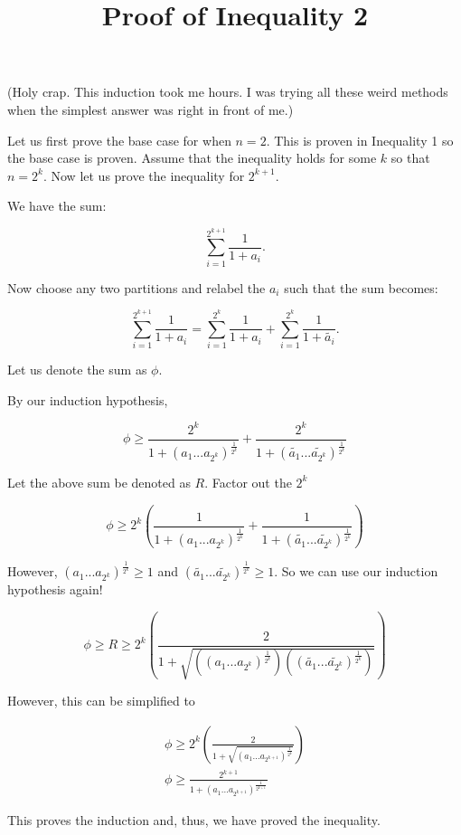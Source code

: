 \documentclass[11pt]{article}
\title{Proof of Inequality 2}
\author{\Name}
\begin{document}
 \maketitle
 
 (Holy crap. This induction took me hours. I was trying all these weird methods when the simplest answer was right in front of me.)
 \newline \newline
 \noindent
 
 Let us first prove the base case for when $n = 2$. This is proven in Inequality 1 so the base case is proven. Assume
 that the inequality holds for some $k$ so that $n = 2^k$. Now let us prove the inequality for 
 $2^{k+1}$. \newline
 
 \noindent
 
 We have the sum:
 
 \begin{equation}
  \sum_{i=1}^{2^{k+1}} \frac{1}{1+a_i}.
 \end{equation}
 
 Now choose any two partitions and relabel the $a_i$ such that the sum becomes:
 
  \begin{equation}
  \sum_{i=1}^{2^{k+1}} \frac{1}{1+a_i} = \sum_{i=1}^{2^{k}} \frac{1}{1+a_i} + \sum_{i=1}^{2^{k}} \frac{1}{1+\widetilde{a_i}}.
 \end{equation}
 
 Let us denote the sum as $\phi$. \newline
 
 
 By our induction hypothesis,
 
 \begin{equation}
  \phi \geq \frac{2^k}{1 + (a_1...a_{2^k})^{\frac{1}{2^k}}} + \frac{2^k}{1 + (\widetilde{a_1}...\widetilde{a_{2^k}})^{\frac{1}{2^k}}}
 \end{equation}

Let the above sum be denoted as $R$. Factor out the $2^k$

\begin{equation}
 \phi \geq 2^k(\frac{1}{1 + (a_1...a_{2^k})^{\frac{1}{2^k}}} + \frac{1}{1 + (\widetilde{a_1}...\widetilde{a_{2^k}})^{\frac{1}{2^k}}})
\end{equation}

However, $(a_1...a_{2^k})^{\frac{1}{2^k}} \geq 1$ and $(\widetilde{a_1}...\widetilde{a_{2^k}})^{\frac{1}{2^k}} \geq 1$. So we can
use our induction hypothesis again!

\begin{equation}
 \phi \geq R \geq 2^k(\frac{2}{1 + \sqrt{((a_1...a_{2^{k}})^{\frac{1}{2^k}})((\widetilde{a_1}...\widetilde{a_{2^k}})^{\frac{1}{2^k}})}})
\end{equation}

However, this can be simplified to

\begin{gather}
 \phi \geq 2^k(\frac{2}{1 + \sqrt{(a_1...a_{2^{k+1}})^{\frac{1}{2^{k}}}}}) \\
 \phi \geq \frac{2^{k+1}}{1 + (a_1...a_{2^{k+1}})^{\frac{1}{2^{k+1}}}}
\end{gather}

This proves the induction and, thus, we have proved the inequality.
\end{document}
